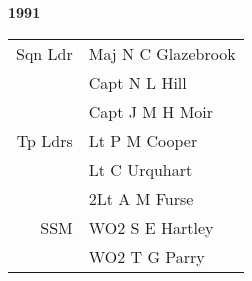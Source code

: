\begin{center}
  \Huge
  \textbf{1991}
\end{center}

\begin{center}
  \small
  \begin{tabular}{rl}
    Sqn Ldr & Maj N C Glazebrook \\
      & Capt N L Hill \\
      & Capt J M H Moir \\
    Tp Ldrs & Lt P M Cooper \\
      & Lt C Urquhart \\
      & 2Lt A M Furse \\
    SSM & WO2 S E Hartley \\
      & WO2 T G Parry \\
  \end{tabular}
\end{center}

